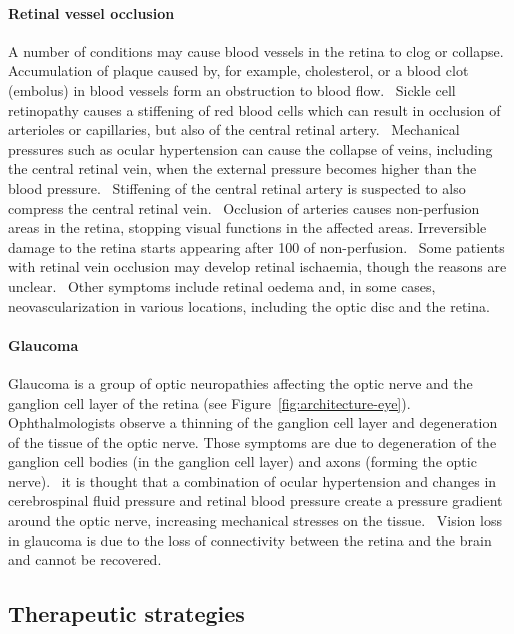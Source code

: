 \documentclass[12pt,a4paper]{journal}
\begin{document}
\paragraph*{Retinal vessel occlusion}
A number of conditions may cause blood vessels in the retina to clog or collapse.
Accumulation of plaque caused by, for example, cholesterol, or a blood clot (embolus) in blood vessels form an obstruction to blood flow.~\cite{Medina_2016}
Sickle cell retinopathy causes a stiffening of red blood cells which can result in occlusion of arterioles or capillaries, but also of the central retinal artery.~\cite{Medina_2016}
Mechanical pressures such as ocular hypertension can cause the collapse of veins, including the central retinal vein, when the external pressure becomes higher than the blood pressure.~\cite{Hayreh_2004}
Stiffening of the central retinal artery is suspected to also compress the central retinal vein.~\cite{Medina_2016}
Occlusion of arteries causes non-perfusion areas in the retina, stopping visual functions in the affected areas.
Irreversible damage to the retina starts appearing after \SI{100}{\min} of non-perfusion.~\cite{Hayreh_2004}
Some patients with retinal vein occlusion may develop retinal ischaemia, though the reasons are unclear.~\cite{Khayat_2018}
Other symptoms include retinal oedema and, in some cases, neovascularization in various locations, including the optic disc and the retina.~\cite{Medina_2016}
\\

\paragraph*{Glaucoma}
Glaucoma is a group of optic neuropathies affecting the optic nerve and the ganglion cell layer of the retina (see Figure~\ref{fig:architecture-eye}).
Ophthalmologists observe a thinning of the ganglion cell layer and degeneration of the tissue of the optic nerve.
Those symptoms are due to degeneration of the ganglion cell bodies (in the ganglion cell layer) and axons (forming the optic nerve).~\cite{Quigley_2011}
it is thought that a combination of ocular hypertension and changes in cerebrospinal fluid pressure and retinal blood pressure create a pressure gradient around the optic nerve, increasing mechanical stresses on the tissue.~\cite{Band_2009,Nickells_2012}
Vision loss in glaucoma is due to the loss of connectivity between the retina and the brain and cannot be recovered.~\cite{Quigley_2011} 


\subsection*{Therapeutic strategies}
\end{document}
